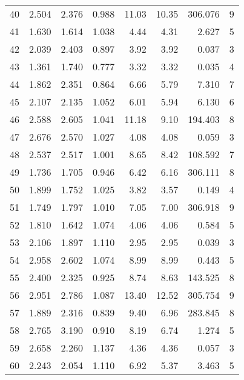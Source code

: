 \begin{tabular}{lrrrrrrr}
40 &     2.504 &      2.376 &      0.988 &   11.03 &    10.35 &  306.076 &        9 \\
41 &     1.630 &      1.614 &      1.038 &    4.44 &     4.31 &    2.627 &        5 \\
42 &     2.039 &      2.403 &      0.897 &    3.92 &     3.92 &    0.037 &        3 \\
43 &     1.361 &      1.740 &      0.777 &    3.32 &     3.32 &    0.035 &        4 \\
44 &     1.862 &      2.351 &      0.864 &    6.66 &     5.79 &    7.310 &        7 \\
45 &     2.107 &      2.135 &      1.052 &    6.01 &     5.94 &    6.130 &        6 \\
46 &     2.588 &      2.605 &      1.041 &   11.18 &     9.10 &  194.403 &        8 \\
47 &     2.676 &      2.570 &      1.027 &    4.08 &     4.08 &    0.059 &        3 \\
48 &     2.537 &      2.517 &      1.001 &    8.65 &     8.42 &  108.592 &        7 \\
49 &     1.736 &      1.705 &      0.946 &    6.42 &     6.16 &  306.111 &        8 \\
50 &     1.899 &      1.752 &      1.025 &    3.82 &     3.57 &    0.149 &        4 \\
51 &     1.749 &      1.797 &      1.010 &    7.05 &     7.00 &  306.918 &        9 \\
52 &     1.810 &      1.642 &      1.074 &    4.06 &     4.06 &    0.584 &        5 \\
53 &     2.106 &      1.897 &      1.110 &    2.95 &     2.95 &    0.039 &        3 \\
54 &     2.958 &      2.602 &      1.074 &    8.99 &     8.99 &    0.443 &        5 \\
55 &     2.400 &      2.325 &      0.925 &    8.74 &     8.63 &  143.525 &        8 \\
56 &     2.951 &      2.786 &      1.087 &   13.40 &    12.52 &  305.754 &        9 \\
57 &     1.889 &      2.316 &      0.839 &    9.40 &     6.96 &  283.845 &        8 \\
58 &     2.765 &      3.190 &      0.910 &    8.19 &     6.74 &    1.274 &        5 \\
59 &     2.658 &      2.260 &      1.137 &    4.36 &     4.36 &    0.057 &        3 \\
60 &     2.243 &      2.054 &      1.110 &    6.92 &     5.37 &    3.463 &        5 \\

\end{tabular}
